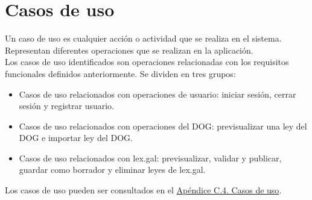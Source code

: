 \section{Casos de uso}

Un caso de uso \cite{casodeuso} es cualquier acción o actividad que se realiza en el sistema. Representan diferentes operaciones que se realizan en la aplicación.
\\

Los casos de uso identificados son operaciones relacionadas con los requisitos funcionales definidos anteriormente. Se dividen en tres grupos: 

\begin{itemize}
    \item Casos de uso relacionados con operaciones de usuario: iniciar sesión, cerrar sesión y registrar usuario.
    \item Casos de uso relacionados con operaciones del DOG: previsualizar una ley del DOG e importar ley del DOG.
    \item Casos de uso relacionados con lex.gal: previsualizar, validar y publicar, guardar como borrador y eliminar leyes de lex.gal.
\end{itemize}

Los casos de uso pueden ser consultados en el \hyperref[APCasosUso]{Apéndice C.4. Casos de uso}.